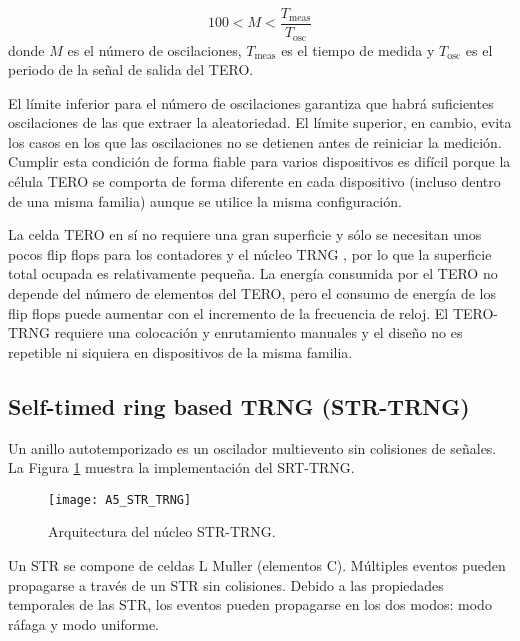             \begin{equation}
                100 < M < \frac{T_{\text{meas}}}{T_{\text{osc}}} 
                \label{eq:limites_tero}
            \end{equation}
            donde $M$ es el número de oscilaciones, $T_{\text{meas}}$ es el tiempo de medida y $T_{\text{osc}}$ es el periodo de la señal de salida del TERO.

            El límite inferior para el número de oscilaciones garantiza que habrá suficientes oscilaciones de las que extraer la aleatoriedad. El límite superior, en cambio, evita los casos en los que las oscilaciones no se detienen antes de reiniciar la medición. Cumplir esta condición de forma fiable para varios dispositivos es difícil porque la célula TERO se comporta de forma diferente en cada dispositivo (incluso dentro de una misma familia) aunque se utilice la misma configuración.

                La celda TERO en sí no requiere una gran superficie y sólo se necesitan unos pocos flip flops para los contadores y el núcleo TRNG \cite{Bernard2018}, por lo que la superficie total ocupada es relativamente pequeña. La energía consumida por el TERO no depende del número de elementos del TERO, pero el consumo de energía de los flip flops puede aumentar con el incremento de la frecuencia de reloj. El TERO-TRNG requiere una colocación y enrutamiento manuales y el diseño no es repetible ni siquiera en dispositivos de la misma familia.
				
		\subsection{Self-timed ring based TRNG (STR-TRNG)}

                Un anillo autotemporizado es un oscilador multievento sin colisiones de señales. La Figura \ref{fig:A5_STR_TRNG} muestra la implementación del SRT-TRNG.
	
				\begin{figure}[hbtp]
					\caption{Arquitectura del núcleo STR-TRNG.}
					\centering
					\texttt{[image: A5\_STR\_TRNG]}
					\label{fig:A5_STR_TRNG}
				\end{figure}

                Un STR se compone de celdas L Muller (elementos C). Múltiples eventos pueden propagarse a través de un STR sin colisiones. Debido a las propiedades temporales de las STR, los eventos pueden propagarse en los dos modos: modo ráfaga y modo uniforme.


